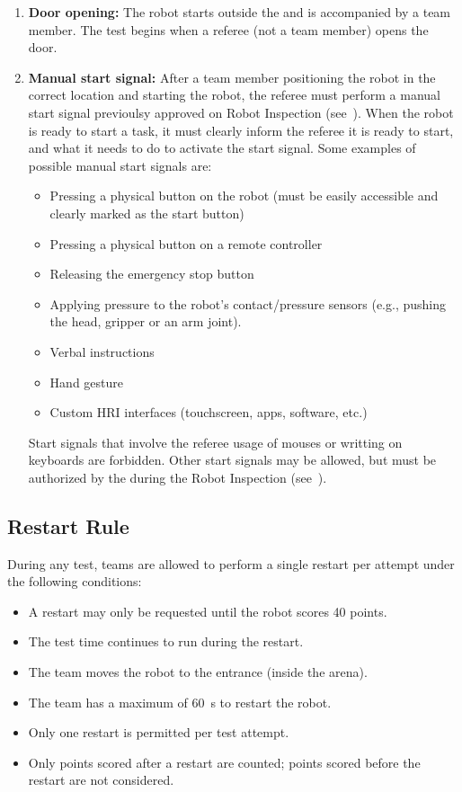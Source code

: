 \begin{enumerate}
    \item \textbf{Door opening:} The robot starts outside the \Arena{} and is accompanied by a team member. The test begins when a referee (not a team member) opens the door.

    \item \textbf{Manual start signal:} After a team member positioning the robot in the correct location and starting the robot, the referee must perform a manual start signal previoulsy approved on Robot Inspection (see~).
	When the robot is ready to start a task, it must clearly inform the referee it is ready to start, and what it needs to do to activate the start signal.
	Some examples of possible manual start signals are:
	\begin{itemize}[nosep]
		\item Pressing a physical button on the robot (must be easily accessible and clearly marked as the start button)
		\item Pressing a physical button on a remote controller
		\item Releasing the emergency stop button
        \item Applying pressure to the robot's contact/pressure sensors (e.g., pushing the head, gripper or an arm joint).
		\item Verbal instructions
		\item Hand gesture
        \item Custom HRI interfaces (touchscreen, apps, software, etc.)
	\end{itemize}
	Start signals that involve the referee usage of mouses or writting on keyboards are forbidden. 
	Other start signals may be allowed, but must be authorized by the \TC{} during the Robot Inspection (see~).

\end{enumerate}

\subsection{Restart Rule}\label{rule:restart}

During any test, teams are allowed to perform a single restart per attempt under the following conditions:
\begin{itemize}
    \item A restart may only be requested until the robot scores 40 points.
    \item The test time continues to run during the restart.
    \item The team moves the robot to the entrance (inside the arena).
    \item The team has a maximum of \SI{60}{\second} to restart the robot.
    \item Only one restart is permitted per test attempt.
    \item Only points scored after a restart are counted; points scored before the restart are not considered.
\end{itemize}



